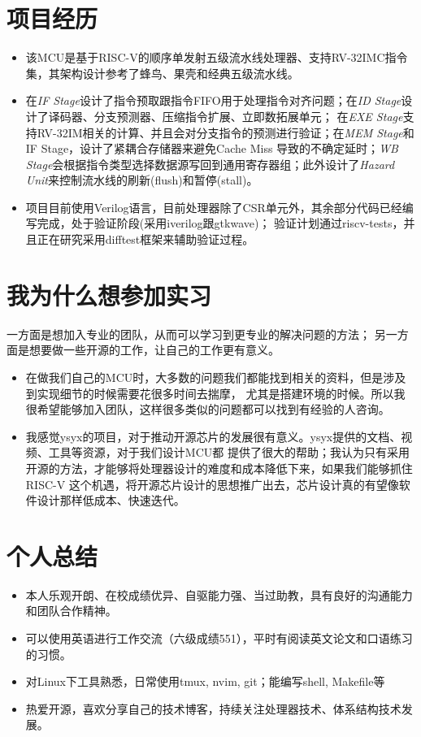 \documentclass{resume}
\begin{document}
\section{项目经历}

\begin{itemize}
    \item 该MCU是基于RISC-V的顺序单发射五级流水线处理器、支持RV-32IMC指令集，其架构设计参考了蜂鸟、果壳和经典五级流水线。
    \item 在\textit{IF Stage}设计了指令预取跟指令FIFO用于处理指令对齐问题；在\textit{ID Stage}设计了译码器、分支预测器、压缩指令扩展、立即数拓展单元；
        在\textit{EXE Stage}支持RV-32IM相关的计算、并且会对分支指令的预测进行验证；在\textit{MEM Stage}和IF Stage，设计了紧耦合存储器来避免Cache Miss
        导致的不确定延时；\textit{WB Stage}会根据指令类型选择数据源写回到通用寄存器组；此外设计了\textit{Hazard Unit}来控制流水线的刷新(flush)和暂停(stall)。
    \item 项目目前使用Verilog语言，目前处理器除了CSR单元外，其余部分代码已经编写完成，处于验证阶段(采用iverilog跟gtkwave)；
        验证计划通过riscv-tests，并且正在研究采用difftest框架来辅助验证过程。
\end{itemize}

\section{我为什么想参加实习}
一方面是想加入专业的团队，从而可以学习到更专业的解决问题的方法；
另一方面是想要做一些开源的工作，让自己的工作更有意义。
\begin{itemize}
    \item 在做我们自己的MCU时，大多数的问题我们都能找到相关的资料，但是涉及到实现细节的时候需要花很多时间去揣摩，
        尤其是搭建环境的时候。所以我很希望能够加入团队，这样很多类似的问题都可以找到有经验的人咨询。
    \item 我感觉ysyx的项目，对于推动开源芯片的发展很有意义。ysyx提供的文档、视频、工具等资源，对于我们设计MCU都
        提供了很大的帮助；我认为只有采用开源的方法，才能够将处理器设计的难度和成本降低下来，如果我们能够抓住RISC-V
        这个机遇，将开源芯片设计的思想推广出去，芯片设计真的有望像软件设计那样低成本、快速迭代。
\end{itemize}

\section{个人总结}
\begin{itemize}
    \item 本人乐观开朗、在校成绩优异、自驱能力强、当过助教，具有良好的沟通能力和团队合作精神。
    \item 可以使用英语进行工作交流（六级成绩551），平时有阅读英文论文和口语练习的习惯。
    \item 对Linux下工具熟悉，日常使用tmux, nvim, git；能编写shell, Makefile等
    \item 热爱开源，喜欢分享自己的技术博客，持续关注处理器技术、体系结构技术发展。
\end{itemize}
\end{document}
